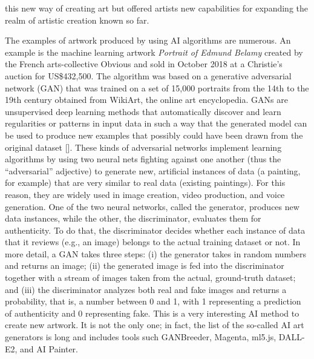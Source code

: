 this new way of creating art but offered artists new capabilities for expanding the realm of artistic creation known so far.

The examples of artwork produced by using AI algorithms are numerous. An example is the machine learning artwork \textit{Portrait of Edmund Belamy} created by the French arts-collective Obvious and sold in October 2018 at a Christie's auction for US\$432,500. The algorithm was based on a generative adversarial network (GAN) that was trained on a set of 15,000 portraits from the 14th to the 19th century obtained from WikiArt, the online art encyclopedia. GANs are unsupervised deep learning methods that automatically discover and learn regularities or patterns in input data in such a way that the generated model can be used to produce new examples that possibly could have been drawn from the original dataset [\citealt{chap:05:Goodfellowetal:2014}]. These kinds of adversarial networks implement learning algorithms by using two neural nets fighting against one another (thus the ``adversarial'' adjective) to generate new, artificial instances of data (a painting, for example) that are very similar to real data (existing paintings). For this reason, they are widely used in image creation, video production, and voice generation. One of the two neural networks, called the generator, produces new data instances, while the other, the discriminator, evaluates them for authenticity. To do that, the discriminator decides whether each instance of data that it reviews (e.g., an image) belongs to the actual training dataset or not. In more detail, a GAN takes three steps: (i) the generator takes in random numbers and returns an image; (ii) the generated image is fed into the discriminator together with a stream of images taken from the actual, ground-truth dataset; and (iii) the discriminator analyzes both real and fake images and returns a probability, that is, a number between 0 and 1, with 1 representing a prediction of authenticity and 0 representing fake. This is a very interesting AI method to create new artwork. It is not the only one; in fact, the list of the so-called AI art generators is long and includes tools such GANBreeder, Magenta, ml5.js, DALL-E2, and AI Painter.

